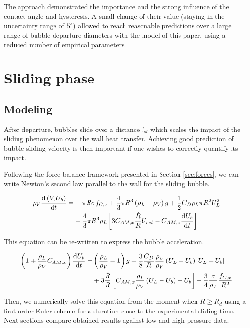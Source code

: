The approach demonstrated the importance and the strong influence of the contact angle and hysteresis. A small change of their value (staying in the uncertainty range of $5\degree$) allowed to reach reasonable predictions over a large range of bubble departure diameters with the model of this paper, using a reduced number of empirical parameters.


\section{Sliding phase}\label{sliding}


\subsection{Modeling}

After departure, bubbles slide over a distance $l_{sl}$ which scales the impact of the sliding phenomenon over the wall heat transfer. Achieving good prediction of bubble sliding velocity is then important if one wishes to correctly quantify its impact. 

Following the force balance framework presented in Section \ref{sec:forces}, we can write Newton's second law parallel to the wall for the sliding bubble.


\begin{align}
\nonumber \rho_{V}\derive{\parth{V_{b}U_{b}}}{t} =& - \pi R\sigma f_{C,x}+ \frac{4}{3}\pi R^{3}\parth{\rho_{L}-\rho_{V}}g + \frac{1}{2}C_{D}\rho_{L}\pi R^{2} U_{L}^{2} \\
%
&+ \frac{4}{3}\pi R^{3}\rho_{L}\crocht{3C_{AM,x}\frac{\dot{R}}{R}U_{rel} - C_{AM,x}\derive{U_{b}}{t}}
\end{align}

This equation can be re-written to express the bubble acceleration.

\begin{align}
\nonumber \parth{1+\frac{\rho_{L}}{\rho_{V}}C_{AM,x}}\derive{U_{b}}{t} = & \parth{\frac{\rho_{L}}{\rho_{V}}-1}g + \frac{3}{8}\frac{C_{D}}{R}\frac{\rho_{L}}{\rho_{V}}\parth{U_{L}-U_{b}}\bars{U_{L}-U_{b}} \\
%
&+ 3\frac{\dot{R}}{R}\crocht{C_{AM,x}\frac{\rho_{L}}{\rho_{V}}\parth{U_{L}-U_{b}}-U_{b}} - \frac{3}{4}\frac{\sigma}{\rho_{V}}\frac{f_{C,x}}{R^{2}}
\label{eq:ub_dot}
\end{align}

Then, we numerically solve this equation from the moment when $R\geq R_{d}$ using a first order Euler scheme for a duration close to the experimental sliding time. Next sections compare obtained results against low and high pressure data.


